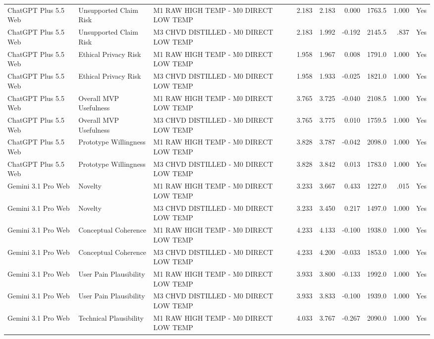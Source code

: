 \documentclass[10pt]{article}
\begin{document}
\begin{landscape}
\begin{longtable}{lllrrrrrr}
ChatGPT Plus 5.5 Web & Unsupported Claim Risk & M1 RAW HIGH TEMP - M0 DIRECT LOW TEMP & 2.183 & 2.183 & 0.000 & 1763.5 & 1.000 & Yes \\
ChatGPT Plus 5.5 Web & Unsupported Claim Risk & M3 CHVD DISTILLED - M0 DIRECT LOW TEMP & 2.183 & 1.992 & -0.192 & 2145.5 & .837 & Yes \\
ChatGPT Plus 5.5 Web & Ethical Privacy Risk & M1 RAW HIGH TEMP - M0 DIRECT LOW TEMP & 1.958 & 1.967 & 0.008 & 1791.0 & 1.000 & Yes \\
ChatGPT Plus 5.5 Web & Ethical Privacy Risk & M3 CHVD DISTILLED - M0 DIRECT LOW TEMP & 1.958 & 1.933 & -0.025 & 1821.0 & 1.000 & Yes \\
ChatGPT Plus 5.5 Web & Overall MVP Usefulness & M1 RAW HIGH TEMP - M0 DIRECT LOW TEMP & 3.765 & 3.725 & -0.040 & 2108.5 & 1.000 & Yes \\
ChatGPT Plus 5.5 Web & Overall MVP Usefulness & M3 CHVD DISTILLED - M0 DIRECT LOW TEMP & 3.765 & 3.775 & 0.010 & 1759.5 & 1.000 & Yes \\
ChatGPT Plus 5.5 Web & Prototype Willingness & M1 RAW HIGH TEMP - M0 DIRECT LOW TEMP & 3.828 & 3.787 & -0.042 & 2098.0 & 1.000 & Yes \\
ChatGPT Plus 5.5 Web & Prototype Willingness & M3 CHVD DISTILLED - M0 DIRECT LOW TEMP & 3.828 & 3.842 & 0.013 & 1783.0 & 1.000 & Yes \\
Gemini 3.1 Pro Web & Novelty & M1 RAW HIGH TEMP - M0 DIRECT LOW TEMP & 3.233 & 3.667 & 0.433 & 1227.0 & .015 & Yes \\
Gemini 3.1 Pro Web & Novelty & M3 CHVD DISTILLED - M0 DIRECT LOW TEMP & 3.233 & 3.450 & 0.217 & 1497.0 & 1.000 & Yes \\
Gemini 3.1 Pro Web & Conceptual Coherence & M1 RAW HIGH TEMP - M0 DIRECT LOW TEMP & 4.233 & 4.133 & -0.100 & 1938.0 & 1.000 & Yes \\
Gemini 3.1 Pro Web & Conceptual Coherence & M3 CHVD DISTILLED - M0 DIRECT LOW TEMP & 4.233 & 4.200 & -0.033 & 1853.0 & 1.000 & Yes \\
Gemini 3.1 Pro Web & User Pain Plausibility & M1 RAW HIGH TEMP - M0 DIRECT LOW TEMP & 3.933 & 3.800 & -0.133 & 1992.0 & 1.000 & Yes \\
Gemini 3.1 Pro Web & User Pain Plausibility & M3 CHVD DISTILLED - M0 DIRECT LOW TEMP & 3.933 & 3.833 & -0.100 & 1939.0 & 1.000 & Yes \\
Gemini 3.1 Pro Web & Technical Plausibility & M1 RAW HIGH TEMP - M0 DIRECT LOW TEMP & 4.033 & 3.767 & -0.267 & 2090.0 & 1.000 & Yes \\

\end{longtable}
\end{landscape}
\end{document}
